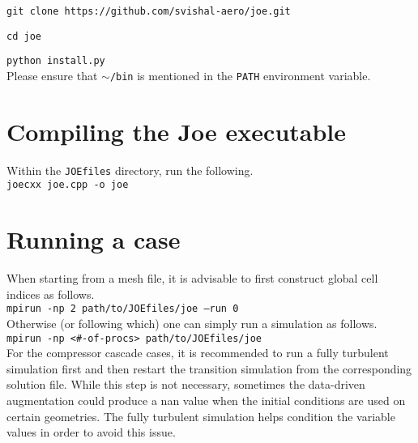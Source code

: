 \documentclass{article}
\begin{document}
\texttt{git clone https://github.com/svishal-aero/joe.git}

\texttt{cd joe}

\texttt{python install.py}\\

Please ensure that $\sim$\texttt{/bin} is mentioned in the \texttt{PATH} environment variable.

\section{Compiling the Joe executable}
Within the \texttt{JOEfiles} directory, run the following.\\

\texttt{joecxx joe.cpp -o joe}

\section{Running a case}
When starting from a mesh file, it is advisable to first construct global cell indices as follows.\\

\texttt{mpirun -np 2 path/to/JOEfiles/joe --run 0} \\

Otherwise (or following which) one can simply run a simulation as follows.\\

\texttt{mpirun -np <\#-of-procs> path/to/JOEfiles/joe}\\

For the compressor cascade cases, it is recommended to run a fully turbulent simulation first and then restart the transition simulation from the corresponding solution file.
While this step is not necessary, sometimes the data-driven augmentation could produce a nan value when the initial conditions are used on certain geometries.
The fully turbulent simulation helps condition the variable values in order to avoid this issue.
\end{document}
